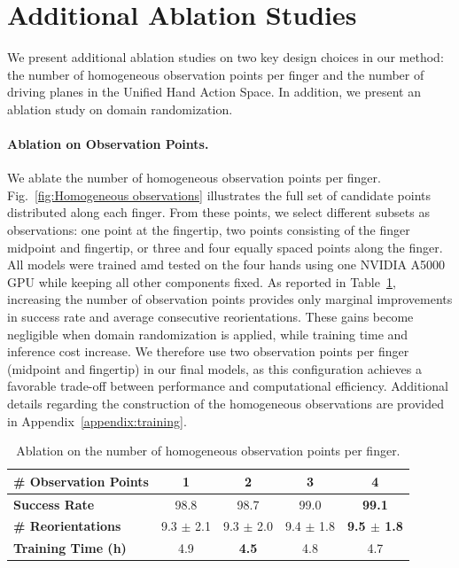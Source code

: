 \section{Additional Ablation Studies}
\label{appendix:ablations}

We present additional ablation studies on two key design choices in our method: the number of homogeneous observation points per finger and the number of driving planes in the Unified Hand Action Space. In addition, we present an ablation study on domain randomization.

\paragraph{Ablation on Observation Points.}
We ablate the number of homogeneous observation points per finger. Fig.~\ref{fig:Homogeneous observations} illustrates the full set of candidate points distributed along each finger. From these points, we select different subsets as observations: one point at the fingertip, two points consisting of the finger midpoint and fingertip, or three and four equally spaced points along the finger. All models were trained amd tested on the four hands using one NVIDIA A5000 GPU while keeping all other components fixed. As reported in Table~\ref{tab:observation_ablation}, increasing the number of observation points provides only marginal improvements in success rate and average consecutive reorientations. These gains become negligible when domain randomization is applied, while training time and inference cost increase. We therefore use two observation points per finger (midpoint and fingertip) in our final models, as this configuration achieves a favorable trade-off between performance and computational efficiency. Additional details regarding the construction of the homogeneous observations are provided in Appendix~\ref{appendix:training}.

\begin{table}[h]
\centering
\caption{Ablation on the number of homogeneous observation points per finger.}
\label{tab:observation_ablation}
\vspace{-2mm}
\setlength{\tabcolsep}{6pt}
\begin{tabular}{lcccc}
\toprule
\textbf{\# Observation Points} 
& \textbf{1} 
& \textbf{2} 
& \textbf{3} 
& \textbf{4} \\
\midrule
\textbf{Success Rate} 
& 98.8
& 98.7
& 99.0
& \textbf{99.1} \\

\textbf{\# Reorientations} 
& 9.3 $\pm$ 2.1
& 9.3 $\pm$ 2.0
& 9.4 $\pm$ 1.8 
& \textbf{9.5 $\pm$ 1.8} \\

\textbf{Training Time (h)} 
& 4.9
& \textbf{4.5}
& 4.8
& 4.7 \\
\bottomrule
\end{tabular}
\vspace{-2mm}
\end{table}
